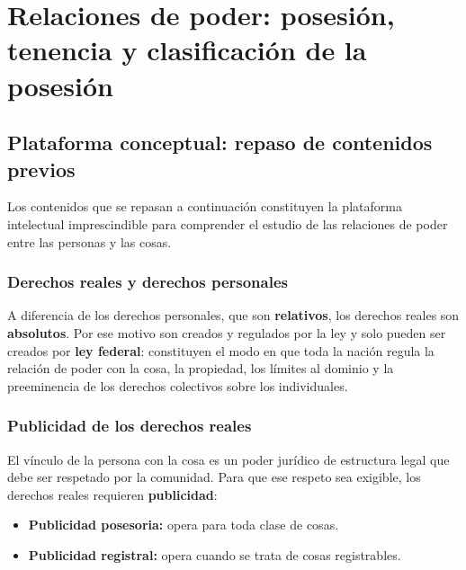 \documentclass[12pt,oneside]{book}
\begin{document}
\tableofcontents
\clearpage
{}

\chapter[Posesión, tenencia y clasificación]{Relaciones de poder: posesión, tenencia y clasificación de la posesión}

\section{Plataforma conceptual: repaso de contenidos previos}

Los contenidos que se repasan a continuación constituyen la plataforma intelectual imprescindible para comprender el estudio de las relaciones de poder entre las personas y las cosas.

\subsection{Derechos reales y derechos personales}

A diferencia de los derechos personales, que son \textbf{relativos}, los derechos reales son \textbf{absolutos}. Por ese motivo son creados y regulados por la ley y solo pueden ser creados por \textbf{ley federal}: constituyen el modo en que toda la nación regula la relación de poder con la cosa, la propiedad, los límites al dominio y la preeminencia de los derechos colectivos sobre los individuales.

\subsection{Publicidad de los derechos reales}

El vínculo de la persona con la cosa es un poder jurídico de estructura legal que debe ser respetado por la comunidad. Para que ese respeto sea exigible, los derechos reales requieren \textbf{publicidad}:

\begin{itemize}
    \item \textbf{Publicidad posesoria:} opera para toda clase de cosas.
    \item \textbf{Publicidad registral:} opera cuando se trata de cosas registrables.
\end{itemize}
\end{document}
